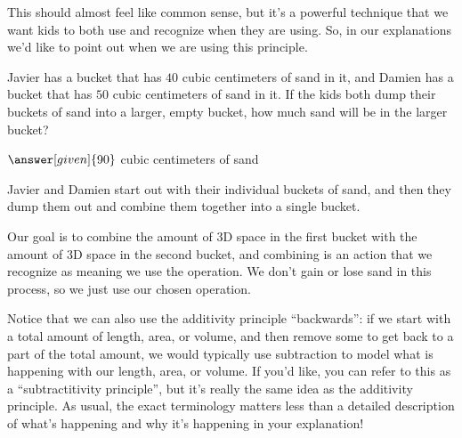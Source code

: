 \documentclass{ximera}
\begin{document}
This should almost feel like common sense, but it's a powerful technique that we want kids to both use and recognize when they are using. So, in our explanations we'd like to point out when we are using this principle.

\begin{question}
Javier has a bucket that has $40$ cubic centimeters of sand in it, and Damien has a bucket that has $50$ cubic centimeters of sand in it. If the kids both dump their buckets of sand into a larger, empty bucket, how much sand will be in the larger bucket?

\begin{prompt} $\answer[given]{90}$ cubic centimeters of sand \end{prompt}

\begin{explanation}
Javier and Damien start out with their individual buckets of sand, and then they dump them out and combine them together into a single bucket.
\begin{image}
\end{image}
Our goal is to combine the amount of 3D space in the first bucket with the amount of 3D space in the second bucket, and combining is an action that we recognize as meaning we use the  operation. We don't gain or lose sand in this process, so we just use our chosen operation.
\end{explanation}
\end{question}

Notice that we can also use the additivity principle ``backwards'': if we start with a total amount of length, area, or volume, and then remove some to get back to a part of the total amount, we would typically use subtraction to model what is happening with our length, area, or volume. If you'd like, you can refer to this as a ``subtractitivity principle'', but it's really the same idea as the additivity principle. As usual, the exact terminology matters less than a detailed description of what's happening and why it's happening in your explanation!
\end{document}
